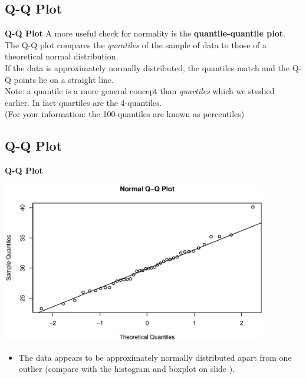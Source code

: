 \documentclass[compress]{beamer}        %
\makeatletter
\newcommand{\tcb}{\textcolor{beamer@blendedblue}}
\makeatother
\begin{document}
\subsection{Q-Q Plot}
\begin{frame}{\bf \tcb{Q-Q Plot}}
A more useful check for normality is the {\bf quantile-quantile plot}.\\[0.8cm]

The Q-Q plot compares the \emph{quantiles} of the sample of data to those of a theoretical normal distribution.\\[0.8cm]

If the data is approximately normally distributed, the quantiles match and the Q-Q points lie on a straight line.\\[0.8cm]

Note: a quantile is a more general concept than \emph{quartiles} which we studied earlier. In fact quartiles are the 4-quantiles.\\
{\footnotesize(For your information: the 100-quantiles are known as percentiles)}

\end{frame}

\subsection{Q-Q Plot}
\begin{frame}{\bf \tcb{Q-Q Plot}\\[-1.1cm]}
\begin{center}
\includegraphics[width=0.87\textwidth, trim = 0.0cm 0.5cm 0.3cm 0.5cm, clip]{QQNorm}
\end{center}
\begin{itemize}
\item The data appears to be approximately normally distributed apart from one outlier {\footnotesize(compare with the histogram and boxplot on slide \pageref{histbox})}.
\end{itemize}

\end{frame}
\end{document}
